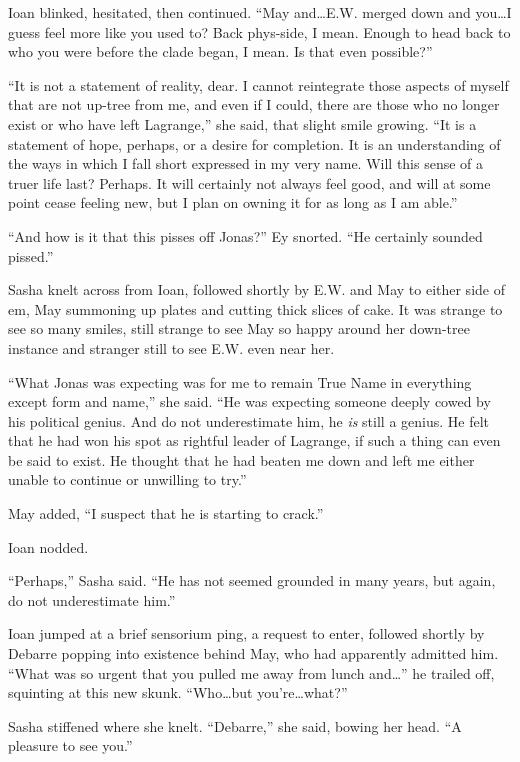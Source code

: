 Ioan blinked, hesitated, then continued. ``May and\ldots E.W. merged down and you\ldots I guess feel more like you used to? Back phys-side, I mean. Enough to head back to who you were before the clade began, I mean. Is that even possible?''

``It is not a statement of reality, dear. I cannot reintegrate those aspects of myself that are not up-tree from me, and even if I could, there are those who no longer exist or who have left Lagrange,'' she said, that slight smile growing. ``It is a statement of hope, perhaps, or a desire for completion. It is an understanding of the ways in which I fall short expressed in my very name. Will this sense of a truer life last? Perhaps. It will certainly not always feel good, and will at some point cease feeling new, but I plan on owning it for as long as I am able.''

``And how is it that this pisses off Jonas?'' Ey snorted. ``He certainly sounded pissed.''

Sasha knelt across from Ioan, followed shortly by E.W. and May to either side of em, May summoning up plates and cutting thick slices of cake. It was strange to see so many smiles, still strange to see May so happy around her down-tree instance and stranger still to see E.W. even near her.

``What Jonas was expecting was for me to remain True Name in everything except form and name,'' she said. ``He was expecting someone deeply cowed by his political genius. And do not underestimate him, he \emph{is} still a genius. He felt that he had won his spot as rightful leader of Lagrange, if such a thing can even be said to exist. He thought that he had beaten me down and left me either unable to continue or unwilling to try.''

May added, ``I suspect that he is starting to crack.''

Ioan nodded.

``Perhaps,'' Sasha said. ``He has not seemed grounded in many years, but again, do not underestimate him.''

Ioan jumped at a brief sensorium ping, a request to enter, followed shortly by Debarre popping into existence behind May, who had apparently admitted him. ``What was so urgent that you pulled me away from lunch and\ldots{}'' he trailed off, squinting at this new skunk. ``Who\ldots but you're\ldots what?''

Sasha stiffened where she knelt. ``Debarre,'' she said, bowing her head. ``A pleasure to see you.''

